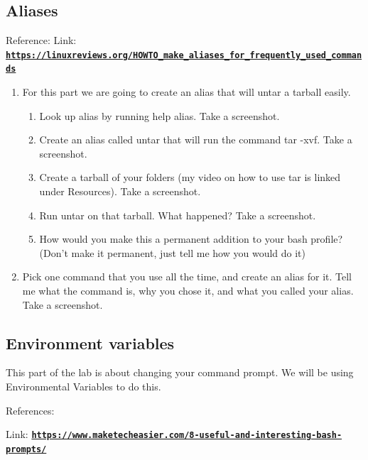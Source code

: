 \documentclass[12pt]{article}
\begin{document}
\subsection*{Aliases}
Reference: Link: \href{https://linuxreviews.org/HOWTO_make_aliases_for_frequently_used_commands}{\textbf{\nolinkurl{https://linuxreviews.org/HOWTO_make_aliases_for_frequently_used_commands}}}
    \begin{enumerate}
        \item For this part we are going to create an alias that will untar a tarball easily.
            \begin{enumerate}
                \item Look up alias by running help alias. Take a screenshot.
                \item Create an alias called untar that will run the command tar -xvf. Take a screenshot.
                \item Create a tarball of your folders (my video on how to use tar is linked under Resources). Take a screenshot.
                \item Run untar on that tarball. What happened? Take a screenshot.
                \item How would you make this a permanent addition to your bash profile? (Don't make it permanent, just tell me how you would do it)
            \end{enumerate}
        \item Pick one command that you use all the time, and create an alias for it. Tell me what the command is, why you chose it, and what you called your alias. Take a screenshot.
    \end{enumerate}

\subsection*{Environment variables}
This part of the lab is about changing your command prompt. We will be using Environmental Variables to do this.

References:

Link: \href{https://www.maketecheasier.com/8-useful-and-interesting-bash-prompts/}{\textbf{\nolinkurl{https://www.maketecheasier.com/8-useful-and-interesting-bash-prompts/}}}
\end{document}
